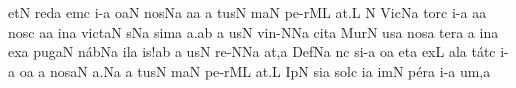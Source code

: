 \spatium
\sgn { }et\punctum N\egn
\spatium
\sgn red\punctum a\egn
\sgn {}em\punctum c\egn
{}i-\punctum a\egn
\sgn {}o{}\clivis aN\egn
\spatium
\sgn n{o}s\pes Na\egn
{}a{}\punctum a\egn
\spatium
\divisiofinalis
\spatium
{}\chorus\punctum a\egn
\sgn tus\punctum N\egn
\spatium
\sgn {}{\'\i}m\cephalicus aN\egn
\sgn pe{-r}\clivis ML\egn
\sgn {}a{t.}\punctum L\egn
\spatium
\divisiofinalis
\spatium
\custos N
\lineaproxima
\sgn Vi{c}\cantores\pes Na\egn
\sgn tor\punctum c\egn
\sgn {}i-\punctum a\egn
\sgn {}a{}\punctum a\egn
\spatium
\sgn n{o}s\punctum c\egn
{}a{}\punctum a\egn
\spatium
\sgn {}in\punctum a\egn
\sgn vi{ct}\clivis aN\egn
\sgn {}{\'\i}s\engl{}\pes Na\egn
\sgn sim\punctum a\egn
\sgn {}a.\punctum a\augmentum b\egn
\spatium
\divisiofinalis
\spatium
{}\chorus\punctum a\egn
\sgn {}us\punctum N\egn
\spatium
\sgn v{i}{n-}\punctum N\spatiumparvum\epiphonus Na\egn
\sgn cit\punctum a\egn
\spatium
\divisiofinalis
\spatium
\sgn M{u}r\cantores\punctum N\egn
\sgn {}us\punctum a\egn
\spatium
\sgn n{o}s\punctum a\egn
\sgn ter\punctum a\egn
\spatium
\custos a
\lineaproxima
\sgn {}in\punctum a\egn
\sgn {}ex\punctum a\egn
\sgn pug\cephalicus aN\egn
\sgn n{\'a}b\pes Na\egn
\sgn {}il\punctum a\egn
\sgn {}i{s!}\punctum a\augmentum b\egn
\spatium
\divisiofinalis
\spatium
{}\chorus\punctum a\egn
\sgn {}us\punctum N\egn
\spatium
\sgn r{e}{-}\punctum N\spatiumparvum\epiphonus Na\egn
{}a{t,}\punctum a\egn
\spatium
\divisiofinalis
\spatium
\sgn Def\cantores\pes Na\egn
{}n\punctum c\egn
\sgn si-\punctum a\egn
\sgn {}o{}\punctum a\egn
\spatium
\sgn {}et\punctum a\egn
\spatium
\sgn {}ex\punctum L\egn
\sgn {}al\punctum a\egn
\sgn t{\'a}t\punctum c\egn
\sgn {}i-\punctum a\egn
\sgn {}o{}\punctum a\egn
\spatium
\custos a
\lineaproxima
\sgn n{o}s\engl{}\clivis aN\egn
{}a{.}\pes Na\egn
\spatium
\divisiofinalis
\spatium
{}\chorus\punctum a\egn
\sgn tus\punctum N\egn
\spatium
\sgn {}{\'\i}m\cephalicus aN\egn
\sgn pe{-r}\clivis ML\egn
\sgn {}a{t.}\punctum L\egn
\spatium
\divisiofinalis
\spatium
\sgn { }Ip\cantores\punctum N\egn
\sgn si{}\punctum a\egn
\spatium
\sgn sol\punctum c\egn
\sgn {}i{}\punctum a\egn
\spatium
\sgn {}im\punctum N\egn
\sgn p{\'e}r\punctum a\egn
\sgn {}i-\punctum a\egn
\sgn {}u{m,}\punctum a\egn
\spatium
